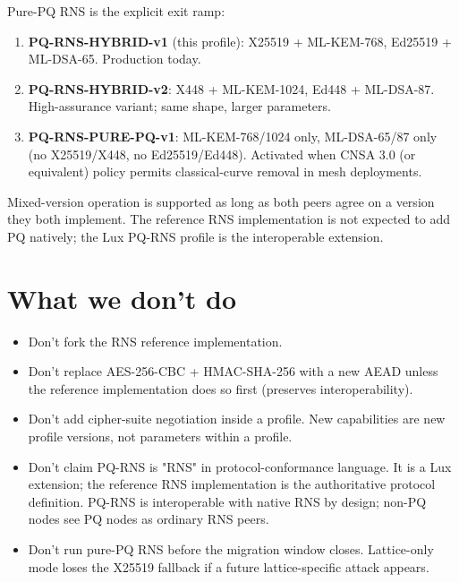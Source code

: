 \documentclass[11pt,a4paper]{article}
\begin{document}
Pure-PQ RNS is the explicit exit ramp:

\begin{enumerate}[leftmargin=*,itemsep=0pt]
\item \textbf{PQ-RNS-HYBRID-v1} (this profile): X25519 + ML-KEM-768,
  Ed25519 + ML-DSA-65. Production today.
\item \textbf{PQ-RNS-HYBRID-v2}: X448 + ML-KEM-1024,
  Ed448 + ML-DSA-87. High-assurance variant; same shape, larger
  parameters.
\item \textbf{PQ-RNS-PURE-PQ-v1}: ML-KEM-768/1024 only,
  ML-DSA-65/87 only (no X25519/X448, no Ed25519/Ed448). Activated
  when CNSA 3.0 (or equivalent) policy permits classical-curve
  removal in mesh deployments.
\end{enumerate}

Mixed-version operation is supported as long as both peers agree on a
version they both implement. The reference RNS implementation is not
expected to add PQ natively; the Lux PQ-RNS profile is the
interoperable extension.

\section{What we don't do}

\begin{itemize}[leftmargin=*,itemsep=0pt]
\item Don't fork the RNS reference implementation.
\item Don't replace AES-256-CBC + HMAC-SHA-256 with a new AEAD unless
  the reference implementation does so first (preserves
  interoperability).
\item Don't add cipher-suite negotiation inside a profile. New
  capabilities are new profile versions, not parameters within a
  profile.
\item Don't claim PQ-RNS is "RNS" in protocol-conformance language.
  It is a Lux extension; the reference RNS implementation is the
  authoritative protocol definition. PQ-RNS is interoperable with
  native RNS by design; non-PQ nodes see PQ nodes as ordinary RNS
  peers.
\item Don't run pure-PQ RNS before the migration window closes.
  Lattice-only mode loses the X25519 fallback if a future
  lattice-specific attack appears.
\end{itemize}

\end{document}
